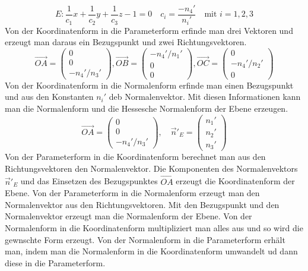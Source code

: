 \begin{equation}
\boxed{E:\dfrac{1}{c_1}x+\dfrac{1}{c_2}y+\dfrac{1}{c_3}z-1=0}\quad \boxed{c_i=\dfrac{-n_4'}{n_i'}\quad \text{mit }i=1,2,3}
\end{equation}
Von der Koordinatenform in die Parameterform erfinde man drei Vektoren und erzeugt man daraus ein Bezugspunkt und zwei Richtungsvektoren.
\begin{equation}
\boxed{\overrightarrow{OA}=\begin{pmatrix}0\\0\\-n_4'/n_3'\end{pmatrix}, \overrightarrow{OB}=\begin{pmatrix}-n_4'/n_1'\\0\\0\end{pmatrix}, \overrightarrow{OC}=\begin{pmatrix}0\\-n_4'/n_2'\\0\end{pmatrix}}
\end{equation}
Von der Koordinatenform in die Normalenform erfinde man einen Bezugspunkt und aus den Konstanten $n_i'$ deb Normalenvektor. Mit diesen Informationen kann man die Normalenform und die Hessesche Normalenform der Ebene erzeugen.
\begin{equation}
\boxed{\overrightarrow{OA}=\begin{pmatrix}0\\0\\-n_4'/n_3'\end{pmatrix},\quad \overrightarrow{n}'_E=\begin{pmatrix}n_1'\\n_2'\\n_3'\end{pmatrix}}
\end{equation}
Von der Parameterform in die Koordinatenform berechnet man aus den Richtungsvektoren den Normalenvektor. Die Komponenten des Normalenvektors $\overrightarrow{n}'_E$ und das Einsetzen des Bezugspunktes $\overrightarrow{OA}$ erzeugt die Koordinatenform der Ebene.
\newline\newline
Von der Parameterform in die Normalenform erzeugt man den Normalenvektor aus den Richtungsvektoren. Mit den Bezugspunkt und den Normalenvektor erzeugt man die Normalenform der Ebene.
\newline\newline
Von der Normalenform in die Koordinatenform multipliziert man alles aus und so wird die gewnschte Form erzeugt.
\newline\newline
Von der Normalenform in die Parameterform erhält man, indem man die Normalenform in die Koordinatenform umwandelt ud dann diese in die Parameterform.
